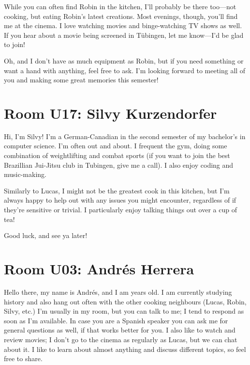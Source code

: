 While you can often find Robin in the kitchen, I’ll probably be there too—not cooking, but eating Robin’s latest creations. Most evenings, though, you’ll find me at the cinema. I love watching movies and binge-watching TV shows as well. If you hear about a movie being screened in Tübingen, let me know—I’d be glad to join!

Oh, and I don’t have as much equipment as Robin, but if you need something or want a hand with anything, feel free to ask. I’m looking forward to meeting all of you and making some great memories this semester!

\section{Room U17: Silvy Kurzendorfer} \label{sec:silvyK}
%
\FPsub\result{\theCurrentDate}{\theBirthdate}
\FPdiv{}
\FPtrunc{}

Hi, I'm Silvy! I'm a German-Canadian in the second semester of my bachelor's in computer science. I'm often out and about. I frequent the gym, doing some combination of weightlifting and combat sports (if you want to join the best Brazillian Jui-Jitsu club in Tubingen, give me a call). I also enjoy coding and music-making.

Similarly to Lucas, I might not be the greatest cook in this kitchen, but I'm always happy to help out with any issues you might encounter, regardless of if they're sensitive or trivial. I particularly enjoy talking things out over a cup of tea!

Good luck, and see ya later!

\section{Room U03: Andrés Herrera} \label{sec:andresH}
%
\FPsub\result{\theCurrentDate}{\theBirthdate}
\FPdiv{}
\FPtrunc{}

Hello there, my name is Andrés, and I am \myage{} years old. I am currently studying history and also hang out often with the other cooking neighbours (Lucas, Robin, Silvy, etc.) I’m usually in my room, but you can talk to me; I tend to respond as soon as I’m available. In case you are a Spanish speaker you can ask me for general questions as well, if that works better for you. I also like to watch and review movies; I don’t go to the cinema as regularly as Lucas, but we can chat about it. I like to learn about almost anything and discuss different topics, so feel free to share.

